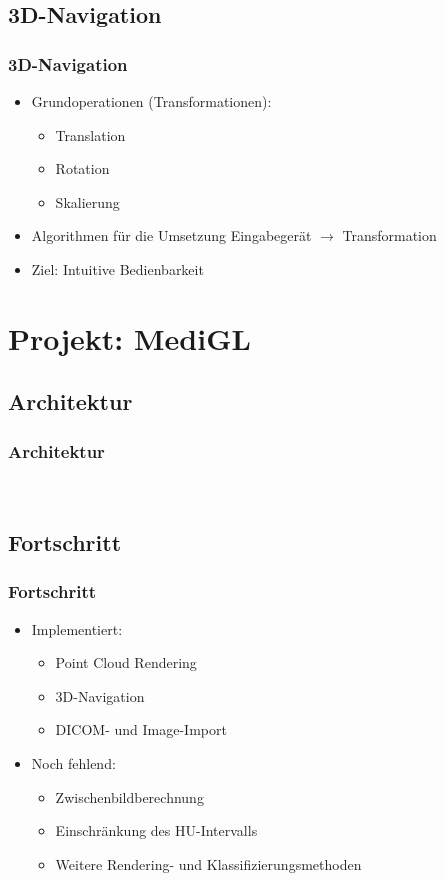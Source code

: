 \documentclass[14pt]{beamer}
\begin{document}
\subsection{3D-Navigation}
\begin{frame}
 \frametitle{3D-Navigation}
 \begin{itemize}
  \item Grundoperationen (Transformationen):
  \begin{itemize}
   \item Translation
   \item Rotation
   \item Skalierung
  \end{itemize}
  \item Algorithmen für die Umsetzung Eingabegerät $\rightarrow$ Transformation
  \item Ziel: Intuitive Bedienbarkeit
 \end{itemize}
\end{frame}
%
%
%
\section{Projekt: MediGL}
%
\subsection{Architektur}
\begin{frame}[allowframebreaks]
\frametitle{Architektur}
\\
\end{frame}
%
\subsection{Fortschritt}
\begin{frame}
\frametitle{Fortschritt}
\begin{itemize}
 \item Implementiert:
  \begin{itemize}
   \item Point Cloud Rendering
   \item 3D-Navigation
   \item DICOM- und Image-Import
  \end{itemize}
  \item Noch fehlend:
  \begin{itemize}
   \item Zwischenbildberechnung
   \item Einschränkung des HU-Intervalls
   \item Weitere Rendering- und Klassifizierungsmethoden
  \end{itemize}
\end{itemize}

\end{frame}
%
%
%
\end{document}
